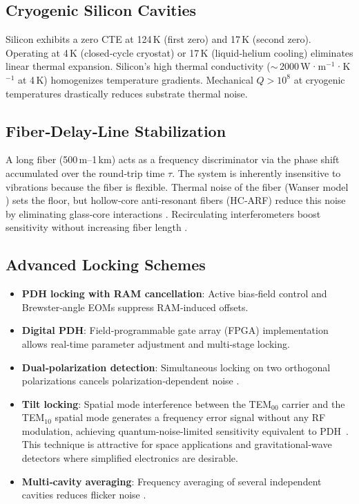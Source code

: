 \documentclass[12pt,a4paper]{article}
\begin{document}
\subsection{Cryogenic Silicon Cavities}
Silicon exhibits a zero CTE at 124 K (first zero) and 17 K (second zero). Operating at 4 K (closed‑cycle cryostat) or 17 K (liquid‑helium cooling) eliminates linear thermal expansion. Silicon's high thermal conductivity ($\sim$ 2000 W·m$^{-1}$·K$^{-1}$ at 4 K) homogenizes temperature gradients. Mechanical $Q > 10^8$ at cryogenic temperatures drastically reduces substrate thermal noise.

\subsection{Fiber‑Delay‑Line Stabilization}
A long fiber (500 m–1 km) acts as a frequency discriminator via the phase shift accumulated over the round‑trip time $\tau$. The system is inherently insensitive to vibrations because the fiber is flexible. Thermal noise of the fiber (Wanser model \cite{dong2015}) sets the floor, but hollow‑core anti‑resonant fibers (HC‑ARF) reduce this noise by eliminating glass‑core interactions \cite{belardi2015}. Recirculating interferometers boost sensitivity without increasing fiber length \cite{gao2025}.

\subsection{Advanced Locking Schemes}
\begin{itemize}
\item \textbf{PDH locking with RAM cancellation}: Active bias‑field control \cite{parke2025} and Brewster‑angle EOMs \cite{tai2016} suppress RAM‑induced offsets.
\item \textbf{Digital PDH}: Field‑programmable gate array (FPGA) implementation allows real‑time parameter adjustment and multi‑stage locking.
\item \textbf{Dual‑polarization detection}: Simultaneous locking on two orthogonal polarizations cancels polarization‑dependent noise \cite{kedar2023}.
\item \textbf{Tilt locking}: Spatial mode interference between the TEM$_{00}$ carrier and the TEM$_{10}$ spatial mode generates a frequency error signal without any RF modulation, achieving quantum-noise-limited sensitivity equivalent to PDH~\cite{shaddock1999}. This technique is attractive for space applications and gravitational-wave detectors where simplified electronics are desirable.
\item \textbf{Multi‑cavity averaging}: Frequency averaging of several independent cavities reduces flicker noise \cite{lee2026,yan2018}.
\end{itemize}
\end{document}
